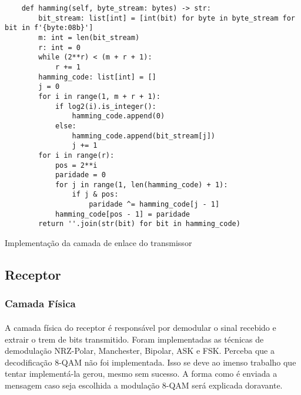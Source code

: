 \documentclass[12pt, a4paper]{article}
\newenvironment{code}{\captionsetup{type=listing}}{}
\begin{document}
\begin{code}
\begin{verbatim}
    def hamming(self, byte_stream: bytes) -> str:
        bit_stream: list[int] = [int(bit) for byte in byte_stream for bit in f'{byte:08b}']
        m: int = len(bit_stream)
        r: int = 0
        while (2**r) < (m + r + 1):
            r += 1
        hamming_code: list[int] = []
        j = 0
        for i in range(1, m + r + 1):
            if log2(i).is_integer():
                hamming_code.append(0)
            else:
                hamming_code.append(bit_stream[j])
                j += 1
        for i in range(r):
            pos = 2**i
            paridade = 0
            for j in range(1, len(hamming_code) + 1):
                if j & pos:
                    paridade ^= hamming_code[j - 1]
            hamming_code[pos - 1] = paridade
        return ''.join(str(bit) for bit in hamming_code)
\end{verbatim}
\caption{Implementação da camada de enlace do transmissor}
\end{code}

\subsection{Receptor}

\subsubsection{Camada Física}
\paragraph{}
A camada física do receptor é responsável por demodular o sinal recebido e extrair o trem de bits transmitido. Foram implementadas as técnicas de demodulação NRZ-Polar, Manchester, Bipolar, ASK e FSK. Perceba que a decodificação 8-QAM não foi implementada. Isso se deve ao imenso trabalho que tentar implementá-la gerou, mesmo sem sucesso. A forma como é enviada a mensagem caso seja escolhida a modulação 8-QAM será explicada doravante.
\end{document}
